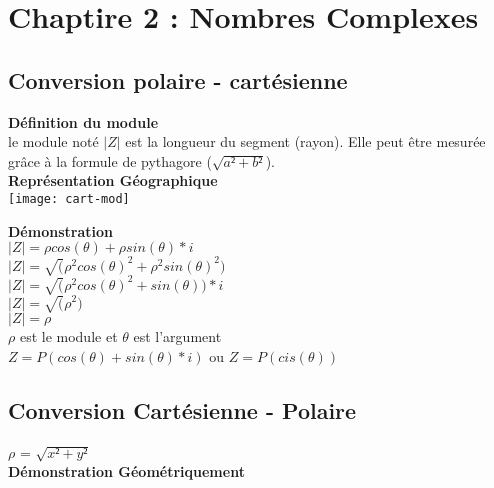 \newpage
\chapter{Chaptire 2 : Nombres Complexes}
\vspace{3mm} %
\section{Conversion polaire - cartésienne}
\vspace{3mm} %

\textbf{Définition du module} \\

le module noté $|Z|$ est la longueur du segment (rayon). Elle peut être mesurée  grâce à la formule de pythagore ($\sqrt{a²+b²}$). \\


\vspace{5mm} %
\textbf{Représentation Géographique} \\

\texttt{[image: cart-mod]}

\textbf{Démonstration}\\

$|Z| = \rho cos(\theta)+ \rho sin(\theta) *i$ \\
$|Z| = \sqrt(\rho^{2} cos(\theta)^{2}+ \rho^{2} sin(\theta)^{2})$ \\
$|Z| = \sqrt(\rho^{2} cos(\theta)^{2}+ sin(\theta))*i $ \\
$|Z| = \sqrt(\rho^{2}) $ \\
$|Z| = \rho $ \\

$\rho$ est le module et $\theta$ est l'argument \\
$Z = P(cos(\theta) + sin(\theta)*i )$ ou $Z= P(cis(\theta))$\\

\newpage

\section{Conversion Cartésienne - Polaire}
\vspace{3mm} %

$\rho$ = $\sqrt{x²+y²}$ \\

\textbf{Démonstration Géométriquement} \\

